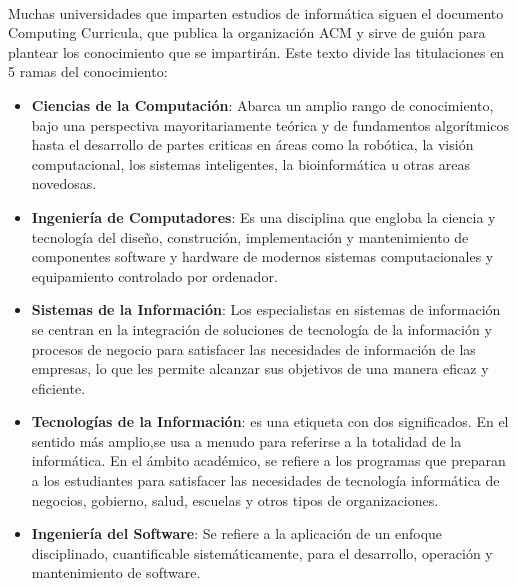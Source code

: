 \documentclass[12pt, a4paper]{report}
\begin{document}
               \paragraph{}
               Muchas universidades que imparten estudios de informática siguen el documento Computing Curricula, que publica la organización ACM y sirve de guión para plantear los conocimiento que se impartirán. Este texto divide las titulaciones en 5 ramas del conocimiento:
               \begin{itemize}
               		\item \textbf{Ciencias de la Computación}: Abarca un amplio rango de conocimiento, bajo una perspectiva mayoritariamente teórica y de fundamentos algorítmicos hasta el desarrollo de partes criticas en áreas como la robótica, la visión computacional, los sistemas inteligentes, la bioinformática u otras areas novedosas. \cite{acm:computing-curricula}

               		\item \textbf{Ingeniería de Computadores}: Es una disciplina que engloba la ciencia y tecnología del diseño, construción, implementación y mantenimiento de componentes software y hardware de modernos sistemas computacionales y equipamiento controlado por ordenador. \cite{acm:computing-curricula} 

               		\item \textbf{Sistemas de la Información}: Los especialistas en sistemas de información se centran en la integración de soluciones de tecnología de la información y procesos de negocio para satisfacer las necesidades de información de las empresas, lo que les permite alcanzar
sus objetivos de una manera eficaz y eficiente.  \cite{acm:computing-curricula}

               		\item \textbf{Tecnologías de la Información}: es una etiqueta con dos significados. En el sentido más amplio,se usa a menudo para referirse a la totalidad de la informática. En el ámbito académico, se refiere a los programas que preparan a los estudiantes para satisfacer las necesidades de tecnología informática de negocios, gobierno, salud, escuelas y otros tipos de organizaciones. \cite{acm:computing-curricula}

               		\item \textbf{Ingeniería del Software}: Se refiere a la aplicación de un enfoque disciplinado, cuantificable sistemáticamente, para el desarrollo, operación y mantenimiento de software.  \cite{acm:computing-curricula}

               \end{itemize}
\end{document}
